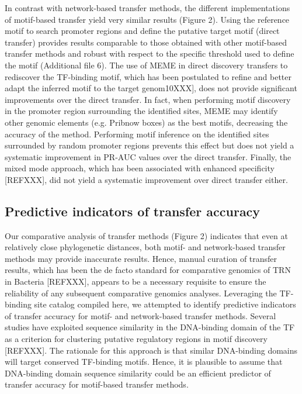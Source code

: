In contrast with network-based transfer methods, the different implementations
of motif-based transfer yield very similar results (Figure 2). Using the
reference motif to search promoter regions and define the putative target motif
(direct transfer) provides results comparable to those obtained with other
motif-based transfer methods and robust with respect to the specific threshold
used to define the motif (Additional file 6). The use of MEME in direct
discovery transfers to rediscover the TF-binding motif, which has been
postulated to refine and better adapt the inferred motif to the target
genom10XXX], does not provide significant improvements over the direct
transfer. In fact, when performing motif discovery in the promoter region
surrounding the identified sites, MEME may identify other genomic elements
(e.g. Pribnow boxes) as the best motifs, decreasing the accuracy of the
method. Performing motif inference on the identified sites surrounded by random
promoter regions prevents this effect but does not yield a systematic
improvement in PR-AUC values over the direct transfer. Finally, the mixed mode
approach, which has been associated with enhanced specificity [REFXXX], did not
yield a systematic improvement over direct transfer either.

\subsection{Predictive indicators of transfer accuracy}

Our comparative analysis of transfer methods (Figure 2) indicates that even at relatively close phylogenetic distances, both motif- and network-based transfer methods may provide inaccurate results. Hence, manual curation of transfer results, which has been the de facto standard for comparative genomics of TRN in Bacteria [REFXXX], appears to be a necessary requisite to ensure the reliability of any subsequent comparative genomics analyses. Leveraging the TF-binding site catalog compiled here, we attempted to identify predictive indicators of transfer accuracy for motif- and network-based transfer methods. Several studies have exploited sequence similarity in the DNA-binding domain of the TF as a criterion for clustering putative regulatory regions in motif discovery [REFXXX]. The rationale for this approach is that similar DNA-binding domains will target conserved TF-binding motifs. Hence, it is plausible to assume that DNA-binding domain sequence similarity could be an efficient predictor of transfer accuracy for motif-based transfer methods.

